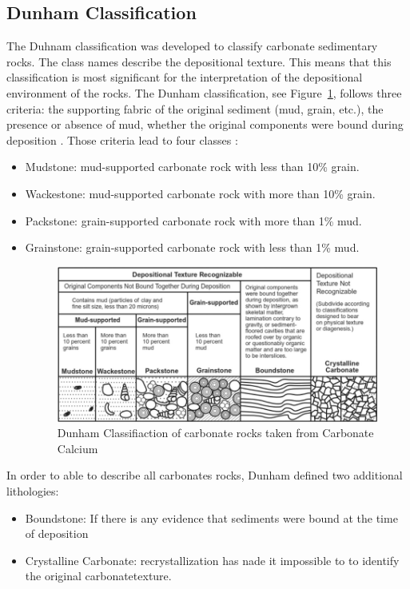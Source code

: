 \subsection{Dunham Classification}
The Duhnam classification was developed to classify carbonate sedimentary rocks. The class names describe the depositional texture. This means that this classification is most significant for the interpretation of the depositional environment of the rocks. The Dunham classification, see Figure~\ref{fig:dunham}, follows three criteria: the supporting fabric of the original sediment (mud, grain, etc.), the presence or absence of mud, whether the original components were bound during deposition \cite{dunhamrevised}.
Those criteria lead to four classes :
\begin{itemize}
    \item Mudstone: mud-supported carbonate rock with less than 10\% grain.
    \item Wackestone: mud-supported carbonate rock with more than 10\% grain.
    \item Packstone: grain-supported carbonate rock with more than 1\% mud.
    \item Grainstone: grain-supported carbonate rock with less than 1\% mud.
	\begin{figure}[!htp]
    \centering
        \includegraphics[width=1\textwidth]{figures/02-Dunhams-classification}
        \caption[Dunham Classifcation]{Dunham Classifiaction of carbonate rocks taken from Carbonate Calcium \cite{dunhamfig}}\label{fig:dunham}
    \end{figure}
\end{itemize}
In order to able to describe all carbonates rocks, Dunham defined two additional lithologies: 
\begin{itemize}
    \item Boundstone: If there is any evidence that sediments were bound at the time of deposition
    \item Crystalline Carbonate: recrystallization has nade it impossible to to identify the original carbonatetexture.
\end{itemize}

